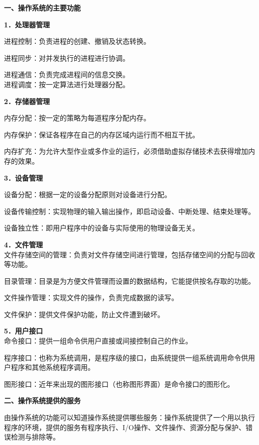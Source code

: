 \textbf{{一、操作系统的主要功能}}

\textbf{{1．处理器管理}}

{进程控制：}负责进程的创建、撤销及状态转换。

{{进程同步}{：}}{对并发执行的进程进行协调。}

{进程通信：}负责完成进程间的信息交换。\\

{进程调度：}按一定算法进行处理器分配。

{\textbf{2．存储器管理}}

{内存分配：}按一定的策略为每道程序分配内存。

{内存保护：}保证各程序在自己的内存区域内运行而不相互干扰。

{内存扩充：}为允许大型作业或多作业的运行，{}必须借助虚拟存储技术去获得增加内存的效果。

\textbf{{3．设备管理}}

{设备分配：}根据一定的设备分配原则对设备进行分配。

{设备传输控制：}实现物理的输入输出操作，即启动设备、中断处理、结束处理等。

{设备独立性：}即用户程序中的设备与实际使用的物理设备无关。

\textbf{{4．文件管理}}\\

文件存储空间的管理：负责对文件存储空间进行管理，包括存储空间的分配与回收等功能。

{目录管理：}目录是为方便文件管理而设置的数据结构，它能提供按名存取的功能。

{文件操作管理：}实现文件的操作，负责完成数据的读写。

{文件保护：}提供文件保护功能，防止文件遭到破坏。

{\textbf{5．用户接口}}\\

{命令接口：}提供一组命令供用户直接或间接控制自己的作业。

{程序接口：}也称为系统调用，是程序级的接口，由系统提供一组系统调用命令供用户程序和其他系统程序调用。

{图形接口：}近年来出现的图形接口（也称图形界面）是命令接口的图形化。

\textbf{{二、操作系统提供的服务}}

由操作系统的功能可以知道操作系统提供哪些服务：操作系统提供了一个用以执行程序的环境，提供的服务有程序执行、I/O操作、文件操作、资源分配与保护、错误检测与排除等。
